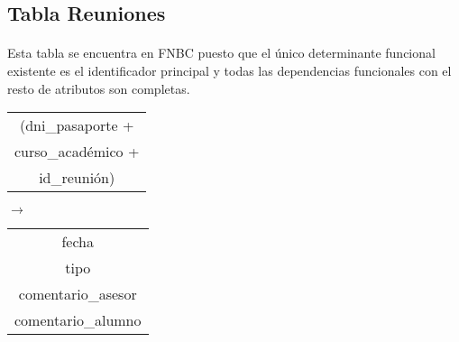 \subsection{Tabla Reuniones}

  \paragraph{}Esta tabla se encuentra en FNBC puesto que el único determinante
  funcional existente es el identificador principal y todas las dependencias
  funcionales con el resto de atributos son completas.

  \begin{center}
    \begin{minipage}{3.9cm}{\begin{flushright}\begin{tabular}{ | c | }
                  \hline
                  (dni\_pasaporte + \\
                  curso\_académico + \\
                  id\_reunión) \\
                  \hline
                 \end{tabular}\end{flushright} }
    \end{minipage}
    \begin{minipage}{0.7cm}{$\longrightarrow$}
    \end{minipage}
    \begin{minipage}{5.9cm}{\begin{tabular}{ | c | }
                  \hline
                  fecha \\
                  tipo \\
                  comentario\_asesor \\
                  comentario\_alumno \\
                  \hline
                 \end{tabular} }
    \end{minipage}
  \end{center}

